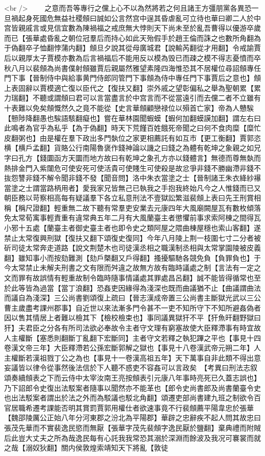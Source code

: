 <br />
　　之意而吾等專行之儻上心不以為然將若之何且諸王方彊朋黨各異恐一旦禍起身死國危無益社稷頠曰誠如公言然宫中逞其昏虐亂可立待也華曰卿二人於中宫皆親戚言或見信宜數為陳禍福之戒庶無大悖則天下尚未至於亂吾曹得以優游卒歲而已【張華處昏亂之朝位冠羣后而持心如此天殆假手於趙王倫而誅之也數所角翻為于偽翻卒子恤翻悖蒲内翻】頠旦夕說其從母廣城君【說輸芮翻從才用翻】令戒諭賈后以親厚太子賈模亦數為后言禍福后不能用反以模為毁已而疎之模不得志憂憤而卒秋八月以裴頠為尚書僕射頠雖賈后親屬然雅望素隆四海惟恐其不居權位尋詔頠專任門下事【晉制侍中與給事黄門侍郎同管門下事頠為侍中專任門下事賈后之意也】頠上表固辭以賈模適亡復以臣代之【復扶又翻】崇外戚之望彰偏私之舉為聖朝累【累力瑞翻】不聽或謂頠曰君可以言當盡言於中宫言而不從當遠引而去儻二者不立雖有十表難以免矣頠慨然久之竟不能從【史言華頠顧戀禄位以殞首亡家】帝為人戇騃【戅陟降翻愚也騃語駭翻癡也】嘗在華林園聞蝦蟆【蝦何加翻蟆謨加翻】謂左右曰此鳴者為官乎為私乎【為于偽翻】時天下荒饉百姓餓死帝聞之曰何不食肉糜【糜忙皮翻粥也】由是權在羣下政出多門埶位之家更相薦託有如互市【更工衡翻】賈郭恣横【横戶孟翻】貨賂公行南陽魯褒作錢神論以譏之曰錢之為體有乾坤之象親之如兄字曰孔方【錢圜函方天圜而地方故曰有乾坤之象孔方亦以錢體言】無德而尊無埶而熱排金門入紫闥危可使安死可使活貴可使賤生可使殺是故忿爭非錢不勝幽滯非錢不抜怨讐非錢不解令聞非錢不發【聞音問】洛中朱衣當塗之士【晉制諸王朱衣絳紗襮當塗之士謂當路柄用者】愛我家兄皆無己已執我之手抱我終始凡今之人惟錢而已又朝臣務以苛察相高每有疑議羣下各立私意刑法不壹獄訟繁滋裴頠上表曰先王刑賞相稱【稱尺證翻】輕重無二故下聽有常羣吏安業去元康四年大風廟闕屋瓦有數枚傾落免太常荀㝢事輕責重有違常典五年二月有大風蘭臺主者懲懼前事求索阿棟之間得瓦小邪十五處【蘭臺主者御史臺主者也即令史之類阿屋之隈曲棟屋穩也索山客翻】遂禁止太常復興刑獄【復扶又翻下頌復史復同】今年八月陵上荆一枝圍七寸二分者被斫司徒太常奔走道路【說文荆楚木也司徒漢丞相之職漢制丞相與太常掌園陵被皮義翻】雖知事小而按劾難測【劾戶槩翻又戶得翻】搔擾驅馳各競免負【負罪負也】于今太常禁止未解夫刑書之文有限而舛違之故無方故有臨時議處之制【言法有一定之文而罪有故誤情有輕重故制令臨時隨事情議處其罪處昌呂翻】誠不能皆得循常也至於此等皆為過當【當丁浪翻】恐姦吏因緣得為淺深也既而曲議猶不止【曲議謂曲法而議自為淺深】三公尚書劉頌復上疏曰【晉志漢成帝置三公尚書主斷獄光武以三公曹主歲盡考課州郡事】自近世以來法漸多門令甚不一吏不知所守下不知所避姦偽者因以售其情居上者難以檢其下【檢校檢束也】事同議異獄犴不平【犴魚旰翻野獄曰犴】夫君臣之分各有所司法欲必奉故令主者守文理有窮塞故使大臣釋滯事有時宜故人主權斷【塞悉則翻斷丁亂翻下宏斷同】主者守文若釋之執犯蹕之平也【事見十四卷漢文帝三年】大臣釋滯若公孫宏斷郭解之獄也【事見十八卷漢武帝元朔二年】人主權斷若漢祖戮丁公之為也【事見十一卷漢高祖五年】天下萬事自非此類不得出意妄議皆以律令從事然後法信於下人聽不惑吏不容姦可以言政矣　【考異曰刑法志叙頌奏續頠表之下而云侍中太宰汝南王亮按頠表引元康八年事時亮死已久蓋志誤也】乃下詔郎令史復出法駁案者隨事以聞然亦不能革也【郎令史尚書郎及尚書蘭臺令史也出法駁案者謂出於法之外而為駁議也駁北角翻】頌遷吏部尚書建九班之制欲令百官居職希遷考課能否明其賞罰賈郭用權仕者欲速事竟不行裴頠薦平陽韋忠於張華【魏邵陵厲公正始八年分河東郡之汾北為平陽郡】華辟之忠辭疾不起人問其故忠曰張茂先華而不實裴逸民慾而無厭【張華字茂先裴頠字逸民厭於鹽翻】棄典禮而附賊后此豈大丈夫之所為哉逸民每有心託我我常恐其溺於深淵而餘波及我况可褰裳而就之哉【溺奴狄翻】關内侯敦煌索靖知天下將亂【敦徒